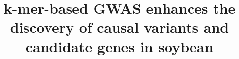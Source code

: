\documentclass[doublespacing]{bmcart}
\begin{document}
\begin{frontmatter}

\begin{fmbox}


\title{k-mer-based GWAS enhances the discovery of causal variants and candidate genes in soybean}

\author[
  addressref={aff1,aff2,aff3},                   %
]{ }
\author[
  addressref={aff1,aff2,aff3},
]{ }
\author[
  addressref={aff1,aff2,aff3},
]{ }
\author[
  addressref={aff1,aff2,aff3},
  email={francois.belzile@fsaa.ulaval.ca}
]{ }

\address[id=aff1]{%
  ,
  ,
  ,
}

\address[id=aff2]{%
  ,
  ,
  ,
}

\address[id=aff3]{%
  ,
  ,
  ,
}



\end{fmbox}%



\end{frontmatter}
\end{document}
